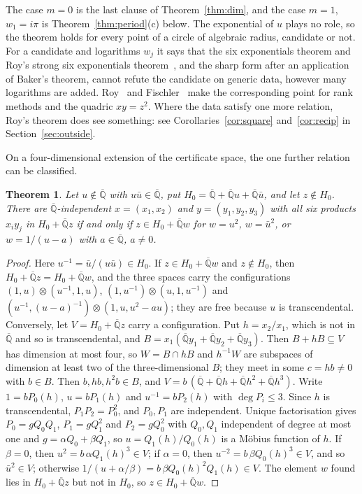 \documentclass[11pt,a4paper]{article}
\theoremstyle{plain}
\newtheorem{theorem}{Theorem}[section]
\theoremstyle{definition}
\newcommand{\Alg}{\overline{\mathbb{Q}}}
\begin{document}
The case $m=0$ is the last clause of Theorem~\ref{thm:dim}, and the case $m=1$, $w_{1}=i\pi$ is
Theorem~\ref{thm:period}(c) below. The exponential of $u$ plays no role, so the theorem holds for every
point of a circle of algebraic radius, candidate or not. For a candidate and logarithms $w_{j}$ it
says that the six exponentials theorem and Roy's strong six exponentials theorem~\cite{roy-1992},
and the sharp form after an application of Baker's theorem, cannot refute the candidate on generic
data, however many logarithms are added. Roy~\cite[\S3.2]{roy-1995} and
Fischler~\cite[p.~186]{fischler-2001} make the corresponding point for rank methods and the quadric
$xy=z^{2}$. Where the data satisfy one more relation, Roy's theorem does see something: see
Corollaries~\ref{cor:square} and~\ref{cor:recip} in Section~\ref{sec:outside}.

On a four-dimensional extension of the certificate space, the one further relation can be classified.

\begin{theorem}\label{thm:extension-room}
Let $u\notin\Alg$ with $u\bar u\in\Alg$, put $H_{0}=\Alg+\Alg u+\Alg\bar u$, and let $z\notin H_{0}$.
There are $\Alg$-independent $x=(x_{1},x_{2})$ and $y=(y_{1},y_{2},y_{3})$ with all six products
$x_{i}y_{j}$ in $H_{0}+\Alg z$ if and only if $z\in H_{0}+\Alg w$ for $w=u^{2}$, $w=\bar u^{2}$, or
$w=1/(u-a)$ with $a\in\Alg$, $a\neq0$.
\end{theorem}

\begin{proof}
Here $u^{-1}=\bar u/(u\bar u)\in H_{0}$. If $z\in H_{0}+\Alg w$ and $z\notin H_{0}$, then
$H_{0}+\Alg z=H_{0}+\Alg w$, and the three spaces carry the configurations $(1,u)\otimes(u^{-1},1,u)$,
$(1,u^{-1})\otimes(u,1,u^{-1})$ and $(u^{-1},(u-a)^{-1})\otimes(1,u,u^{2}-au)$; they are free because
$u$ is transcendental. Conversely, let $V=H_{0}+\Alg z$ carry a configuration. Put $h=x_{2}/x_{1}$,
which is not in $\Alg$ and so is transcendental, and $B=x_{1}(\Alg y_{1}+\Alg y_{2}+\Alg y_{3})$. Then
$B+hB\subseteq V$ has dimension at most four, so $W=B\cap hB$ and $h^{-1}W$ are subspaces of dimension at
least two of the three-dimensional $B$; they meet in some $c=hb\neq0$ with $b\in B$. Then $b,hb,h^{2}b\in B$,
and $V=b\,(\Alg+\Alg h+\Alg h^{2}+\Alg h^{3})$. Write $1=bP_{0}(h)$, $u=bP_{1}(h)$ and $u^{-1}=bP_{2}(h)$
with $\deg P_{i}\le3$. Since $h$ is transcendental, $P_{1}P_{2}=P_{0}^{2}$, and $P_{0},P_{1}$ are independent.
Unique factorisation gives $P_{0}=gQ_{0}Q_{1}$, $P_{1}=gQ_{1}^{2}$ and $P_{2}=gQ_{0}^{2}$ with $Q_{0},Q_{1}$
independent of degree at most one and $g=\alpha Q_{0}+\beta Q_{1}$, so $u=Q_{1}(h)/Q_{0}(h)$ is a Möbius
function of $h$. If $\beta=0$, then $u^{2}=b\,\alpha Q_{1}(h)^{3}\in V$; if $\alpha=0$, then
$u^{-2}=b\,\beta Q_{0}(h)^{3}\in V$, and so $\bar u^{2}\in V$; otherwise
$1/(u+\alpha/\beta)=b\,\beta Q_{0}(h)^{2}Q_{1}(h)\in V$. The element $w$ found lies in $H_{0}+\Alg z$
but not in $H_{0}$, so $z\in H_{0}+\Alg w$.
\end{proof}
\end{document}
